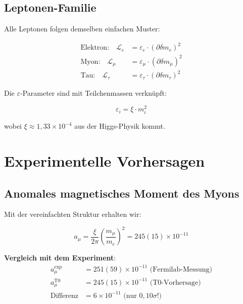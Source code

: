 \documentclass[12pt,a4paper]{article}
\newcommand{\deltam}{\delta m}
\newcommand{\Lag}{\mathcal{L}}
\newcommand{\xipar}{\xi}
\theoremstyle{definition}
\theoremstyle{remark}
\begin{document}
	\subsection{Leptonen-Familie}
	
	Alle Leptonen folgen demselben einfachen Muster:
	
	\begin{align}
		\text{Elektron:} \quad \Lag_e &= \varepsilon_e \cdot (\partial \deltam_e)^2 \\
		\text{Myon:} \quad \Lag_{\mu} &= \varepsilon_{\mu} \cdot (\partial \deltam_{\mu})^2 \\
		\text{Tau:} \quad \Lag_{\tau} &= \varepsilon_{\tau} \cdot (\partial \deltam_{\tau})^2
	\end{align}
	
	Die $\varepsilon$-Parameter sind mit Teilchenmassen verknüpft:
	
	\begin{equation}
		\varepsilon_i = \xipar \cdot m_i^2
		\label{eq:epsilon_mass_relation}
	\end{equation}
	
	wobei $\xipar \approx 1{,}33 \times 10^{-4}$ aus der Higgs-Physik kommt.
	
	\section{Experimentelle Vorhersagen}
	
	\subsection{Anomales magnetisches Moment des Myons}
	
	Mit der vereinfachten Struktur erhalten wir:
	
	\begin{equation}
		a_{\mu} = \frac{\xipar}{2\pi} \left(\frac{m_{\mu}}{m_e}\right)^2 = 245(15) \times 10^{-11}
		\label{eq:muon_g2}
	\end{equation}
	
	\textbf{Vergleich mit dem Experiment}:
	\begin{align}
		a_{\mu}^{\text{exp}} &= 251(59) \times 10^{-11} \text{ (Fermilab-Messung)} \\
		a_{\mu}^{\text{T0}} &= 245(15) \times 10^{-11} \text{ (T0-Vorhersage)} \\
		\text{Differenz} &= 6 \times 10^{-11} \text{ (nur } 0{,}10\sigma\text{!)}
	\end{align}
	
\end{document}
